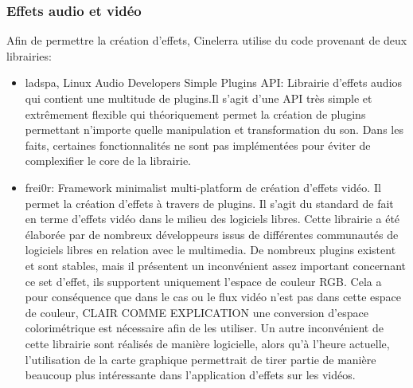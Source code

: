 \subsubsection {Effets audio et vidéo}

Afin de permettre la création d'effets, Cinelerra utilise du  code
provenant de deux librairies:

\begin{itemize}

  \item {ladspa, Linux Audio Developers Simple Plugins API: Librairie
  d'effets audios qui contient une multitude de plugins.Il s'agit d'une
  API très simple et extrêmement flexible qui théoriquement permet
  la création de plugins permettant n'importe quelle manipulation et
  transformation du son. Dans les faits, certaines fonctionnalités
  ne sont pas implémentées pour éviter de complexifier le core de
  la librairie.}

  \item {frei0r: Framework minimalist multi-platform de création
    d'effets vidéo. Il permet la création d'effets à travers de
    plugins. Il s'agit du standard de fait en terme d'effets vidéo dans
    le milieu des logiciels libres. Cette librairie a été élaborée
    par de nombreux développeurs issus de différentes communautés
    de logiciels libres en relation avec le multimedia. De nombreux
    plugins existent et sont stables, mais il présentent un inconvénient
    assez important concernant ce set d'effet, ils supportent uniquement
    l'espace de couleur RGB. Cela a pour conséquence que dans le cas ou
    le flux vidéo n'est pas dans cette espace de couleur,%
    CLAIR COMME EXPLICATION  une conversion d'espace
    colorimétrique est nécessaire afin de les utiliser. Un autre
    inconvénient de cette librairie %
    sont réalisés de manière logicielle, alors qu'à l'heure actuelle,
    l'utilisation de la carte graphique permettrait de tirer partie de
    manière beaucoup plus intéressante dans l'application d'effets
    sur les vidéos.}



\end{itemize}

